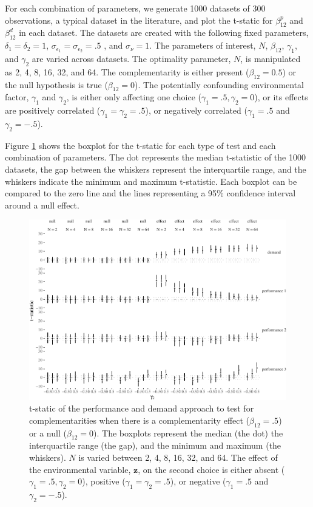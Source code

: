 \documentclass[12pt]{article}
\begin{document}
For each combination of parameters, we generate 1000 datasets of 300
observations, a typical dataset in the literature, and plot the t-static
for \(\beta^p_{12}\) and \(\beta^d_{12}\) in each dataset. The datasets
are created with the following fixed parameters,
\(\delta_1 = \delta_2 = 1\),
\(\sigma_{\epsilon_1} = \sigma_{\epsilon_2} = .5\) , and
\(\sigma_{\nu} = 1\). The parameters of interest, \(N\), \(\beta_{12}\),
\(\gamma_1\), and \(\gamma_2\) are varied across datasets. The
optimality parameter, \(N\), is manipulated as 2, 4, 8, 16, 32, and 64.
The complementarity is either present (\(\beta_{12} = 0.5\)) or the null
hypothesis is true (\(\beta_{12} = 0\)). The potentially confounding
environmental factor, \(\gamma_1\) and \(\gamma_2\), is either only
affecting one choice (\(\gamma_1 = .5, \gamma_2 = 0\)), or its effects
are positively correlated (\(\gamma_1 = \gamma_2 = .5\)), or negatively
correlated (\(\gamma_1 = .5\) and \(\gamma_2 = -.5\)).

Figure \ref{basic} shows the boxplot for the t-static for each type of
test and each combination of parameters. The dot represents the median
t-statistic of the 1000 datasets, the gap between the whiskers represent
the interquartile range, and the whiskers indicate the minimum and
maximum t-statistic. Each boxplot can be compared to the zero line and
the lines representing a 95\% confidence interval around a null effect.

\begin{figure}

\includegraphics[width=500px]{figure-latex/unnamed-chunk-5-1}
\caption[Error Rate and Power of Demand and Performance Specification]
{\label{basic} t-static of the performance and demand approach to test
for complementarities when there is a complementarity effect ($\beta_{12} = .5$)
or a null ($\beta_{12} = 0$). The boxplots represent the median (the dot) the
interquartile range (the gap), and the minimum and maximum (the whiskers). $N$
is varied between 2, 4, 8, 16, 32, and 64. The effect of the environmental
variable, $\mathbf{z}$, on the second choice is either absent
($\gamma_1 = .5,  \gamma_2 = 0$), positive ($\gamma_1 = \gamma_2 = .5$),
or negative ($\gamma_1 = .5$ and $\gamma_2 = -.5$).}
\end{figure}
\end{document}
